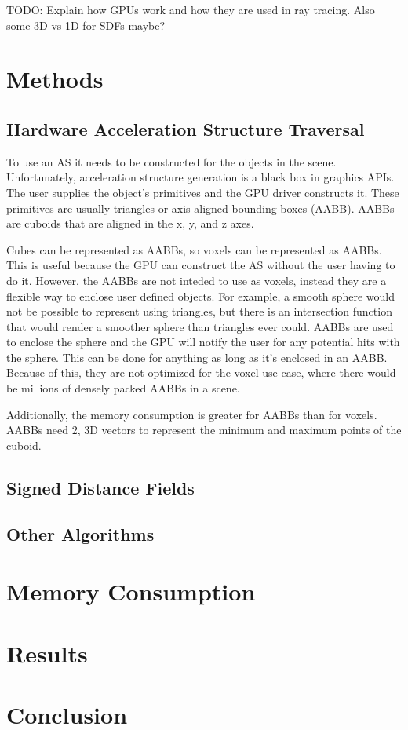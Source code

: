 \documentclass[12pt]{article}
\begin{document}
TODO: Explain how GPUs work and how they are used in ray tracing. Also some 3D vs 1D for SDFs maybe?

\section{Methods}
\subsection{Hardware Acceleration Structure Traversal}

To use an AS it needs to be constructed for the objects in the scene.
Unfortunately, acceleration structure generation is a black box in graphics APIs. 
The user supplies the object's primitives and the GPU driver constructs it.
These primitives are usually triangles or axis aligned bounding boxes (AABB).
AABBs are cuboids that are aligned in the x, y, and z axes.

Cubes can be represented as AABBs, so voxels can be represented as AABBs.
This is useful because the GPU can construct the AS without the user having to do it.
However, the AABBs are not inteded to use as voxels, instead they are a flexible way to enclose user defined objects.
For example, a smooth sphere would not be possible to represent using triangles, but there 
is an intersection function that would render a smoother sphere than triangles ever could.
AABBs are used to enclose the sphere and the GPU will notify the user for any potential hits with the sphere.
This can be done for anything as long as it's enclosed in an AABB.
Because of this, they are not optimized for the voxel use case, where there would be millions of
densely packed AABBs in a scene.

Additionally, the memory consumption is greater for AABBs than for voxels.
AABBs need 2, 3D vectors to represent the minimum and maximum points of the cuboid.


\subsection{Signed Distance Fields}
\subsection{Other Algorithms}

\section{Memory Consumption}

\section{Results}

\section{Conclusion}

\printbibliography
\end{document}
